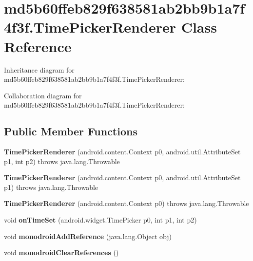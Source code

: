 \hypertarget{classmd5b60ffeb829f638581ab2bb9b1a7f4f3f_1_1_time_picker_renderer}{}\section{md5b60ffeb829f638581ab2bb9b1a7f4f3f.\+Time\+Picker\+Renderer Class Reference}
\label{classmd5b60ffeb829f638581ab2bb9b1a7f4f3f_1_1_time_picker_renderer}


Inheritance diagram for md5b60ffeb829f638581ab2bb9b1a7f4f3f.\+Time\+Picker\+Renderer\+:


Collaboration diagram for md5b60ffeb829f638581ab2bb9b1a7f4f3f.\+Time\+Picker\+Renderer\+:
\subsection*{Public Member Functions}
\begin{DoxyCompactItemize}
\item 
\mbox{\label{classmd5b60ffeb829f638581ab2bb9b1a7f4f3f_1_1_time_picker_renderer_aea08e098874d7b721d4936ff36f29e0e}} 
{\bfseries Time\+Picker\+Renderer} (android.\+content.\+Context p0, android.\+util.\+Attribute\+Set p1, int p2)  throws java.\+lang.\+Throwable 	
\item 
\mbox{\label{classmd5b60ffeb829f638581ab2bb9b1a7f4f3f_1_1_time_picker_renderer_a66248b9a92ae22c9d0929971dabb0092}} 
{\bfseries Time\+Picker\+Renderer} (android.\+content.\+Context p0, android.\+util.\+Attribute\+Set p1)  throws java.\+lang.\+Throwable 	
\item 
\mbox{\label{classmd5b60ffeb829f638581ab2bb9b1a7f4f3f_1_1_time_picker_renderer_a88438e043108dffa9cb1d613995b7aa1}} 
{\bfseries Time\+Picker\+Renderer} (android.\+content.\+Context p0)  throws java.\+lang.\+Throwable 	
\item 
\mbox{\label{classmd5b60ffeb829f638581ab2bb9b1a7f4f3f_1_1_time_picker_renderer_ac2ef26492e19e4ba5a31033d11ae8a6a}} 
void {\bfseries on\+Time\+Set} (android.\+widget.\+Time\+Picker p0, int p1, int p2)
\item 
\mbox{\label{classmd5b60ffeb829f638581ab2bb9b1a7f4f3f_1_1_time_picker_renderer_a09ae55d639cff012f899b5f0d3854c43}} 
void {\bfseries monodroid\+Add\+Reference} (java.\+lang.\+Object obj)
\item 
\mbox{\label{classmd5b60ffeb829f638581ab2bb9b1a7f4f3f_1_1_time_picker_renderer_adc6b30a3a46eab5938559e8d3c3674c2}} 
void {\bfseries monodroid\+Clear\+References} ()
\end{DoxyCompactItemize}
